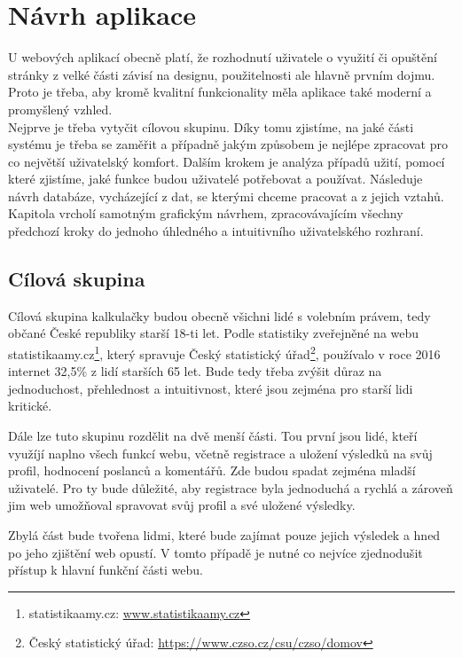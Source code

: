 \chapter{Návrh aplikace}
\label{chap:navrh}
U webových aplikací obecně platí, že rozhodnutí uživatele o využití či opuštění stránky z velké části závisí na designu, použitelnosti ale hlavně prvním dojmu. Proto je třeba, aby kromě kvalitní funkcionality měla aplikace také moderní a promyšlený vzhled. \\
Nejprve je třeba vytyčit cílovou skupinu. Díky tomu zjistíme, na jaké části systému je třeba se zaměřit a případně jakým způsobem je nejlépe zpracovat pro co největší uživatelský komfort. Dalším krokem je analýza případů užití, pomocí které zjistíme, jaké funkce budou uživatelé potřebovat a používat. Následuje návrh databáze, vycházející z dat, se kterými chceme pracovat a z jejich vztahů. Kapitola vrcholí samotným grafickým návrhem, zpracovávajícím všechny předchozí kroky do jednoho úhledného a intuitivního uživatelského rozhraní.


\section{Cílová skupina}
Cílová skupina kalkulačky budou obecně všichni lidé s volebním právem, tedy občané České republiky starší 18-ti let.\cite{ustava-volebni_pravo} Podle statistiky zveřejněné na webu statistikaamy.cz\footnote{statistikaamy.cz: \url{www.statistikaamy.cz}}, který spravuje Český statistický úřad\footnote{Český statistický úřad: \url{https://www.czso.cz/csu/czso/domov}}, používalo v roce 2016 internet 32,5\% z lidí starších 65 let\cite{statistikaamy}. Bude tedy třeba zvýšit důraz na jednoduchost, přehlednost a intuitivnost, které jsou zejména pro starší lidi kritické.
\par Dále lze tuto skupinu rozdělit na dvě menší části. Tou první jsou lidé, kteří využíjí naplno všech funkcí webu, včetně registrace a uložení výsledků na svůj profil, hodnocení poslanců a komentářů. Zde budou spadat zejména mladší uživatelé. Pro ty bude důležité, aby registrace byla jednoduchá a rychlá a zároveň jim web umožňoval spravovat svůj profil a své uložené výsledky. 
\par Zbylá část bude tvořena lidmi, které bude zajímat pouze jejich výsledek a hned po jeho zjištění web opustí. V tomto případě je nutné co nejvíce zjednodušit přístup k hlavní funkční části webu. 


